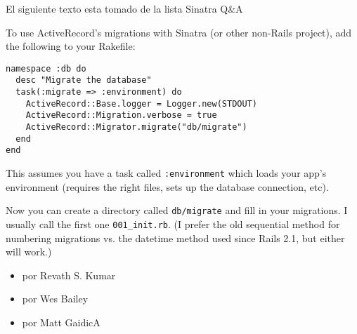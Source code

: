 El siguiente texto esta tomado de la lista
Sinatra Q\&A

To use ActiveRecord’s migrations with Sinatra (or other non-Rails
project), add the following to your Rakefile:
\begin{verbatim}
namespace :db do
  desc "Migrate the database"
  task(:migrate => :environment) do
    ActiveRecord::Base.logger = Logger.new(STDOUT)
    ActiveRecord::Migration.verbose = true
    ActiveRecord::Migrator.migrate("db/migrate")
  end
end
\end{verbatim}
This assumes you have a task called \verb|:environment| which loads your app’s
environment (requires the right files, sets up the database connection,
etc).

Now you can create a directory called \verb|db/migrate| 
and fill in your migrations. I usually call the first one 
\verb|001_init.rb|. (I prefer the old
sequential method for numbering migrations vs. the datetime method used
since Rails 2.1, but either will work.)

\begin{itemize}
\item
{} por Revath S. Kumar
\item
{} por Wes Bailey
\item
{} por Matt GaidicA
\end{itemize}


